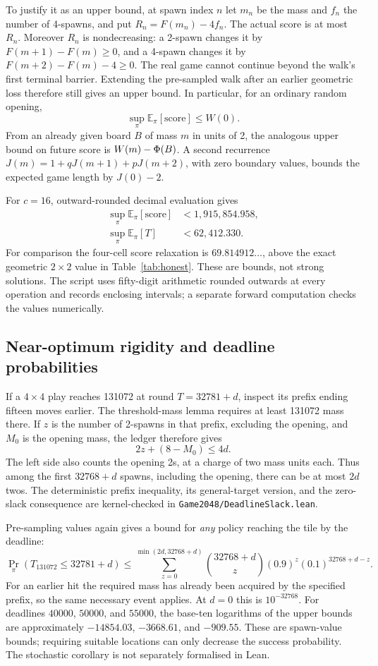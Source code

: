 To justify it as an upper bound, at spawn index $n$ let $m_n$ be the
mass and $f_n$ the number of 4-spawns, and put $R_n=F(m_n)-4f_n$.
The actual score is at most $R_n$. Moreover $R_n$ is nondecreasing:
a 2-spawn changes it by $F(m+1)-F(m)\ge0$, and a 4-spawn changes it by
$F(m+2)-F(m)-4\ge0$. The real game cannot continue beyond the walk's
first terminal barrier. Extending the pre-sampled walk after an earlier
geometric loss therefore still gives an upper bound. In particular,
for an ordinary random opening,
\[
\sup_\pi\mathbb E_\pi[\mathrm{score}]\le W(0).
\]
From an already given board $B$ of mass $m$ in units of 2, the analogous
upper bound on future score is $W(m)-\Phi(B)$.
A second recurrence $J(m)=1+qJ(m+1)+pJ(m+2)$, with zero boundary values,
bounds the expected game length by $J(0)-2$.

For $c=16$, outward-rounded decimal evaluation gives
\begin{align*}
\sup_\pi\mathbb E_\pi[\mathrm{score}]&<1{,}915{,}854.958,\\
\sup_\pi\mathbb E_\pi[T]&<62{,}412.330.
\end{align*}
For comparison the four-cell score relaxation is $69.814912\ldots$,
above the exact geometric $2\times2$ value in Table~\ref{tab:honest}.
These are bounds, not strong solutions. The script
 uses fifty-digit arithmetic rounded
outwards at every operation and records enclosing intervals; a separate
forward computation checks the values numerically.

\subsection{Near-optimum rigidity and deadline probabilities}
\label{sec:slack}

If a $4\times4$ play reaches 131072 at round $T=32781+d$, inspect its
prefix ending fifteen moves earlier. The threshold-mass lemma requires
at least 131072 mass there. If $z$ is the number of 2-spawns in that
prefix, excluding the opening, and $M_0$ is the opening mass, the ledger
therefore gives
\[
2z+(8-M_0)\le4d.
\]
The left side also counts the opening 2s, at a charge of two mass units
each. Thus among the first $32768+d$ spawns, including the opening,
there can be at most $2d$ twos. The deterministic prefix inequality,
its general-target version, and the zero-slack consequence are
kernel-checked in \texttt{Game2048/DeadlineSlack.lean}.

Pre-sampling values again gives a bound for \emph{any} policy reaching
the tile by the deadline:
\[
\Pr_\pi(T_{131072}\le32781+d)
\le \sum_{z=0}^{\min(2d,32768+d)}
 \binom{32768+d}{z}(0.9)^z(0.1)^{32768+d-z}.
\]
For an earlier hit the required mass has already been acquired by the
specified prefix, so the same necessary event applies. At $d=0$ this
is $10^{-32768}$. For deadlines $40000$, $50000$, and $55000$, the
base-ten logarithms of the upper bounds are approximately
$-14854.03$, $-3668.61$, and $-909.55$. These are spawn-value bounds;
requiring suitable locations can only decrease the success probability.
The stochastic corollary is not separately formalised in Lean.

